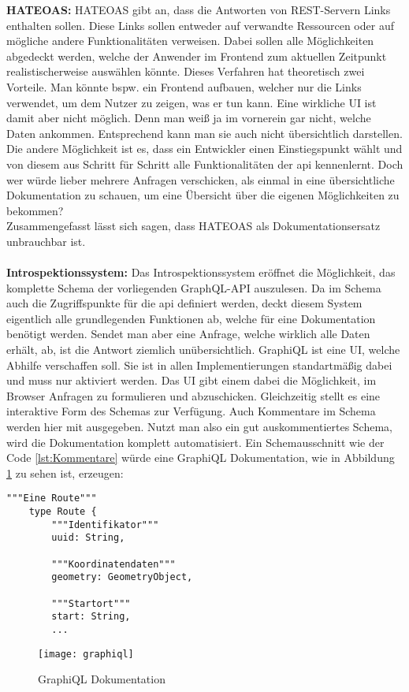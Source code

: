 \textbf{HATEOAS:} \ac{HATEOAS} gibt an, dass die Antworten von REST-Servern Links enthalten sollen. Diese Links sollen entweder auf verwandte Ressourcen oder auf mögliche andere Funktionalitäten verweisen. Dabei sollen alle Möglichkeiten abgedeckt werden, welche der Anwender im Frontend zum aktuellen Zeitpunkt realistischerweise auswählen könnte. Dieses Verfahren hat theoretisch zwei Vorteile. Man könnte bspw. ein Frontend aufbauen, welcher nur die Links verwendet, um dem Nutzer zu zeigen, was er tun kann. Eine wirkliche \ac{UI} ist damit aber nicht möglich. Denn man weiß ja im vornerein gar nicht, welche Daten ankommen. Entsprechend kann man sie auch nicht übersichtlich darstellen.\\
Die andere Möglichkeit ist es, dass ein Entwickler einen Einstiegspunkt wählt und von diesem aus Schritt für Schritt alle Funktionalitäten der \ac{api} kennenlernt. Doch wer würde lieber mehrere Anfragen verschicken, als einmal in eine übersichtliche Dokumentation zu schauen, um eine Übersicht über die eigenen Möglichkeiten zu bekommen?\\
Zusammengefasst lässt sich sagen, dass \ac{HATEOAS} als Dokumentationsersatz unbrauchbar ist.\\
\\
\textbf{Introspektionssystem:} Das Introspektionssystem eröffnet die Möglichkeit, das komplette Schema  der vorliegenden GraphQL-API auszulesen. Da im Schema auch die Zugriffspunkte für die \ac{api} definiert werden, deckt diesem System eigentlich alle grundlegenden Funktionen ab, welche für eine Dokumentation benötigt werden. Sendet man aber eine Anfrage, welche wirklich alle Daten erhält, ab, ist die Antwort ziemlich unüber\-sichtlich. GraphiQL ist eine \ac{UI}, welche Abhilfe verschaffen soll. Sie ist in allen Implementierungen standartmäßig dabei und muss nur aktiviert werden. Das \ac{UI} gibt einem dabei die Möglichkeit, im Browser Anfragen zu formulieren und abzuschicken. Gleichzeitig stellt es eine interaktive Form des Schemas zur Verfügung. Auch Kommentare im Schema werden hier mit ausgegeben. Nutzt man also ein gut auskommentiertes Schema, wird die Dokumentation komplett automatisiert. Ein Schemausschnitt wie der Code \ref{lst:Kommentare} würde eine GraphiQL Dokumentation, wie in Abbildung \ref{fig:graphiql} zu sehen ist, erzeugen: 

\begin{lstlisting}[caption={Schema mit Kommentaren},captionpos=b,label=lst:Kommentare] 
"""Eine Route"""
	type Route {
		"""Identifikator"""
		uuid: String,

		"""Koordinatendaten"""
		geometry: GeometryObject,

		"""Startort"""
		start: String,	
		...
\end{lstlisting}
\begin{figure}
\texttt{[image: graphiql]}
\caption{GraphiQL Dokumentation}
\label{fig:graphiql}
\end{figure}

